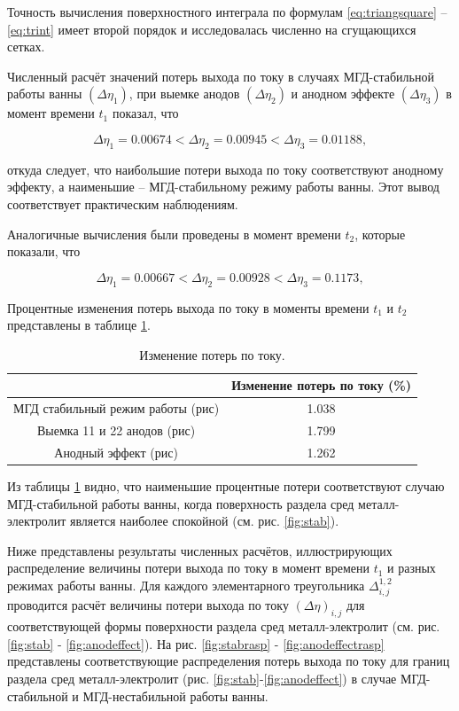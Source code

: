 \documentclass{article}
\begin{document}
Точность вычисления поверхностного интеграла по формулам \ref{eq:triangsquare} – \ref{eq:trint} имеет второй порядок и исследовалась численно на сгущающихся сетках.

Численный расчёт значений потерь выхода по току в случаях МГД-стабильной работы ванны $(\Delta\eta_1)$, при выемке анодов $(\Delta\eta_2)$ и анодном эффекте $(\Delta\eta_3)$ в момент времени $t_1$ показал, что 

\begin{equation}
\Delta\eta_1 = 0.00674 < \Delta\eta_2 = 0.00945 < \Delta\eta_3 = 0.01188,
\end{equation}

откуда следует, что наибольшие потери выхода по току соответствуют анодному эффекту, а наименьшие – МГД-стабильному режиму работы ванны. Этот вывод соответствует практическим наблюдениям.

Аналогичные вычисления были проведены в момент времени $t_2$, которые показали, что

\begin{equation}
\Delta\eta_1 = 0.00667 < \Delta\eta_2 = 0.00928 < \Delta\eta_3 = 0.1173,
\end{equation}

Процентные изменения потерь выхода по току в моменты времени $t_1$ и $t_2$ представлены в таблице \ref{table:ismineniep}. 

\begin{table}[H]
\centering
\begin{tabular}{|c|c|}
\hline
			& Изменение потерь по току (\%)\\
\hline
МГД стабильный режим работы (рис) & 1.038	\\
\hline
Выемка 11 и 22 анодов (рис) &	1.799\\
\hline
Анодный эффект (рис) & 1.262	\\
\hline
\end{tabular}
\caption{Изменение потерь по току. \label{table:ismineniep}}
\end{table}

Из таблицы \ref{table:ismineniep} видно, что наименьшие процентные потери соответствуют случаю МГД-стабильной работы ванны, когда поверхность раздела сред металл-электролит является наиболее спокойной (см. рис. \ref{fig:stab}).

Ниже представлены результаты численных расчётов, иллюстрирующих распределение величины потери выхода по току в момент времени $t_1$ и разных режимах работы ванны. Для каждого элементарного треугольника $\Delta^{1,2}_{i,j}$ проводится расчёт величины потери выхода по току $(\Delta\eta)_{i,j}$ для соответствующей формы поверхности раздела сред металл-электролит (см. рис. \ref{fig:stab} - \ref{fig:anodeffect}). На рис. \ref{fig:stabrasp} - \ref{fig:anodeffectrasp} представлены соответствующие распределения потерь выхода по току для границ раздела сред металл-электролит (рис. \ref{fig:stab}-\ref{fig:anodeffect}) в случае МГД-стабильной и МГД-нестабильной работы ванны.
\end{document}
